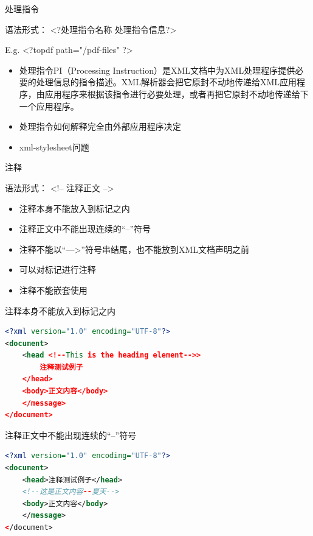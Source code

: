 \begin{frame}{处理指令}
\begin{shaded}
\par 语法形式： <?处理指令名称 处理指令信息?>
\par E.g. <?topdf path="/pdf-files" ?>
\end{shaded}

\begin{itemize}
\item 处理指令PI（Processing Instruction）是XML文档中为XML处理程序提供必要的处理信息的指令描述。XML解析器会把它原封不动地传递给XML应用程序，由应用程序来根据该指令进行必要处理，或者再把它原封不动地传递给下一个应用程序。
\item  处理指令如何解释完全由外部应用程序决定
\item xml-stylesheet问题
\end{itemize}
\end{frame}


\begin{frame}{注释}
\begin{shaded}
\par 语法形式： <!-- 注释正文 -->
\end{shaded}

\begin{itemize}
\item 注释本身不能放入到标记之内
\item  注释正文中不能出现连续的“--”符号
\item 注释不能以“--->”符号串结尾，也不能放到XML文档声明之前
\item 可以对标记进行注释
\item 注释不能嵌套使用
\end{itemize}
\end{frame}


\begin{frame}[fragile]{注释本身不能放入到标记之内}
\begin{lstlisting}[tabsize=8, basicstyle=\small\tt, language=XML]
<?xml version="1.0" encoding="UTF-8"?>
<document>
    <head <!--This is the heading element-->>
        注释测试例子
    </head>
    <body>正文内容</body>
    </message>
</document>
\end{lstlisting}
\end{frame}


\begin{frame}[fragile]{注释正文中不能出现连续的“--”符号}
\begin{lstlisting}[tabsize=8, basicstyle=\small\tt, language=XML]
<?xml version="1.0" encoding="UTF-8"?>
<document>
    <head>注释测试例子</head>
    <!--这是正文内容--夏天-->
    <body>正文内容</body>
    </message>
</document>
\end{lstlisting}
\end{frame}



